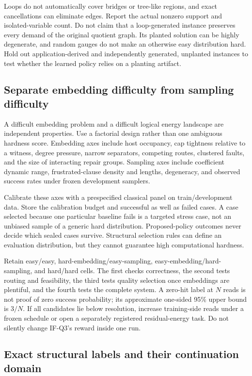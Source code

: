 Loops do not automatically cover bridges or tree-like regions, and exact cancellations can eliminate edges. Report the actual nonzero support and isolated-variable count. Do not claim that a loop-generated instance preserves every demand of the original quotient graph. Its planted solution can be highly degenerate, and random gauges do not make an otherwise easy distribution hard. Hold out application-derived and independently generated, unplanted instances to test whether the learned policy relies on a planting artifact.

\subsection{Separate embedding difficulty from sampling difficulty}
\label{data:hardness}

A difficult embedding problem and a difficult logical energy landscape are independent properties. Use a factorial design rather than one ambiguous hardness score. Embedding axes include host occupancy, cap tightness relative to a witness, degree pressure, narrow separators, competing routes, clustered faults, and the size of interacting repair groups. Sampling axes include coefficient dynamic range, frustrated-clause density and lengths, degeneracy, and observed success rates under frozen development samplers.

Calibrate these axes with a prespecified classical panel on train/development data. Store the calibration budget and successful as well as failed cases. A case selected because one particular baseline fails is a targeted stress case, not an unbiased sample of a generic hard distribution. Proposed-policy outcomes never decide which sealed cases survive. Structural selection rules can define an evaluation distribution, but they cannot guarantee high computational hardness.

Retain easy/easy, hard-embedding/easy-sampling, easy-embedding/hard-sampling, and hard/hard cells. The first checks correctness, the second tests routing and feasibility, the third tests quality selection once embeddings are plentiful, and the fourth tests the complete system. A zero-hit label at $N$ reads is not proof of zero success probability; its approximate one-sided 95\% upper bound is $3/N$. If all candidates lie below resolution, increase training-side reads under a frozen schedule or open a separately registered residual-energy task. Do not silently change IF-Q3's reward inside one run.

\subsection{Exact structural labels and their continuation domain}
\label{data:structural}

